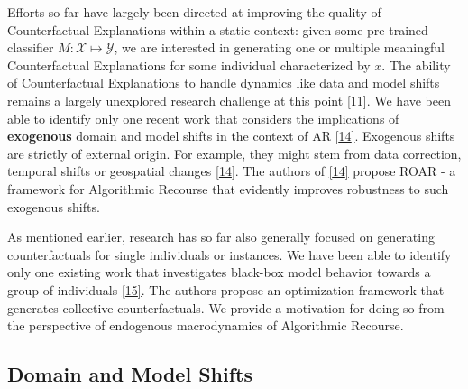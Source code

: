 \documentclass[conference,final,]{IEEEtran}
\begin{document}
Efforts so far have largely been directed at improving the quality of Counterfactual Explanations within a static context: given some pre-trained classifier \(M: \mathcal{X} \mapsto \mathcal{Y}\), we are interested in generating one or multiple meaningful Counterfactual Explanations for some individual characterized by \(x\). The ability of Counterfactual Explanations to handle dynamics like data and model shifts remains a largely unexplored research challenge at this point \protect\hyperlink{ref-verma2020counterfactual}{{[}11{]}}. We have been able to identify only one recent work that considers the implications of \textbf{exogenous} domain and model shifts in the context of AR \protect\hyperlink{ref-upadhyay2021towards}{{[}14{]}}. Exogenous shifts are strictly of external origin. For example, they might stem from data correction, temporal shifts or geospatial changes \protect\hyperlink{ref-upadhyay2021towards}{{[}14{]}}. The authors of \protect\hyperlink{ref-upadhyay2021towards}{{[}14{]}} propose ROAR - a framework for Algorithmic Recourse that evidently improves robustness to such exogenous shifts.

As mentioned earlier, research has so far also generally focused on generating counterfactuals for single individuals or instances. We have been able to identify only one existing work that investigates black-box model behavior towards a group of individuals \protect\hyperlink{ref-carrizosa2021generating}{{[}15{]}}. The authors propose an optimization framework that generates collective counterfactuals. We provide a motivation for doing so from the perspective of endogenous macrodynamics of Algorithmic Recourse.

\hypertarget{related-shifts}{%
\subsection{Domain and Model Shifts}\label{related-shifts}}
\end{document}
